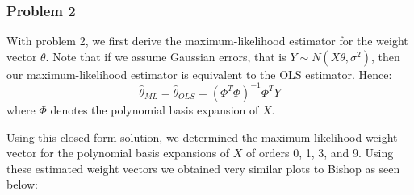 \documentclass[10pt]{article}
\begin{document}
\subsubsection*{Problem 2}

With problem 2, we first derive the maximum-likelihood estimator for the weight vector $\theta$. Note that if we assume Gaussian errors, that is $Y \sim N(X\theta, \sigma^2)$, then our maximum-likelihood estimator is equivalent to the OLS estimator. Hence:
\begin{equation*}
	\hat{\theta}_{ML}=\hat{\theta}_{OLS}=(\Phi^T \Phi)^{-1}\Phi^T Y
\end{equation*}
where $\Phi$ denotes the polynomial basis expansion of $X$.

Using this closed form solution, we determined the maximum-likelihood weight vector for the polynomial basis expansions of $X$ of orders 0, 1, 3, and 9. Using these estimated weight vectors we obtained very similar plots to Bishop as seen below:
\end{document}
